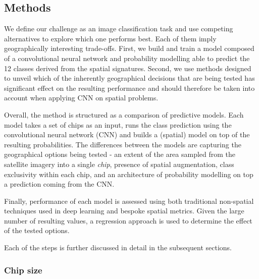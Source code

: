 \subsection{Methods}


We define our challenge as an image classification task and use competing alternatives
to explore which one performs best. Each of them imply geographically interesting
trade-offs. First, we build and train a model composed of a convolutional neural network
and probability modelling able to predict the 12 classes derived from the spatial
signatures. Second, we use methods designed to unveil which of the inherently
geographical decisions that are being tested has significant effect on the resulting
performance and should therefore be taken into account when applying CNN on spatial
problems.

Overall, the method is structured as a comparison of predictive models. Each model takes
a set of chips as an input, runs the class prediction using the convolutional neural
network (CNN) and builds a (spatial) model on top of the resulting probabilities. The
differences between the models are capturing the geographical options being tested - an
extent of the area sampled from the satellite imagery into a single \textit{chip},
presence of spatial augmentation, class exclusivity within each chip, and an
architecture of probability modelling on top a prediction coming from the CNN.

Finally, performance of each model is assessed using both traditional non-spatial
techniques used in deep learning and bespoke spatial metrics. Given the large number of
resulting values, a regression approach is used to determine the effect of the tested
options.

Each of the steps is further discussed in detail in the subsequent sections.

\subsubsection{Chip size}


